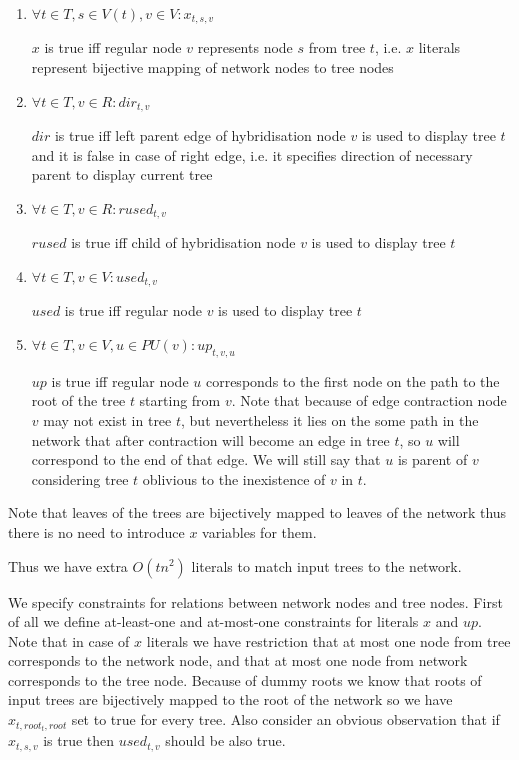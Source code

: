 \documentclass[runningheads, envcountsame, a4paper]{llncs}
\begin{document}
\begin{enumerate}

\item $\forall t \in T, s \in V(t), v \in V : x_{t,s,v}$

$x$ is true iff regular node $v$ represents node $s$ from tree $t$, i.e. $x$ literals represent bijective 
mapping of network nodes to tree nodes

\item $\forall t \in T, v \in R : dir_{t,v}$

$dir$ is true iff left parent edge of hybridisation node $v$ is used to display tree $t$ and it is false in case 
of right edge, i.e. it specifies direction of necessary parent to display current tree

\item $\forall t \in T, v \in R : rused_{t,v}$

$rused$ is true iff child of hybridisation node $v$ is used to display tree $t$

\item $\forall t \in T, v \in V : used_{t,v}$

$used$ is true iff regular node $v$ is used to display tree $t$

\item $\forall t \in T, v \in V, u \in PU(v) : up_{t,v,u}$

$up$ is true iff regular node $u$ corresponds to the first node on the path to the root of the tree $t$ starting 
from $v$. Note that because of edge contraction node $v$ may not exist in tree $t$, but nevertheless it lies on 
the some path in the network that after contraction will become an edge in tree $t$, so $u$ will correspond to 
the end of that edge. We will still say that $u$ is parent of $v$ considering tree $t$ oblivious to the inexistence of
$v$ in $t$.

\end{enumerate}

Note that leaves of the trees are bijectively mapped to leaves of the network thus there is no need to introduce $x$ variables for them. 

Thus we have extra $O(t n^2)$ literals to match input trees to the network.

We specify constraints for relations between network nodes and tree nodes. 
First of all we define at-least-one and at-most-one constraints for literals $x$ and $up$. Note that in case 
of $x$ literals we have restriction that at most one node from tree corresponds to the network node, and that at 
most one node from network corresponds to the tree node. Because of dummy roots we know that roots of input trees 
are bijectively mapped to the root of the network so we have $x_{t,root_t,root}$ set to true for every tree. Also 
consider an obvious observation that if $x_{t,s,v}$ is true then $used_{t,v}$ should be also true.
\end{document}
